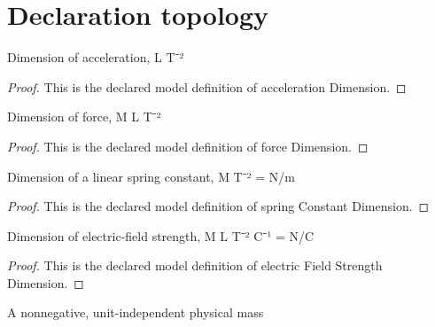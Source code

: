 \section{Declaration topology}
\begin{definition}
  \label{def:physics:phyx-mini-0891:phyxminiproblems-problemphyxmini0891-accelerationdimension}
  Dimension of acceleration, L T⁻²
\end{definition}
\begin{proof}
  This is the declared model definition of acceleration Dimension.
\end{proof}
\begin{definition}
  \label{def:physics:phyx-mini-0891:phyxminiproblems-problemphyxmini0891-forcedimension}
  Dimension of force, M L T⁻²
\end{definition}
\begin{proof}
  This is the declared model definition of force Dimension.
\end{proof}
\begin{definition}
  \label{def:physics:phyx-mini-0891:phyxminiproblems-problemphyxmini0891-springconstantdimension}
  Dimension of a linear spring constant, M T⁻² = N/m
\end{definition}
\begin{proof}
  This is the declared model definition of spring Constant Dimension.
\end{proof}
\begin{definition}
  \label{def:physics:phyx-mini-0891:phyxminiproblems-problemphyxmini0891-electricfieldstrengthdimension}
  Dimension of electric-field strength, M L T⁻² C⁻¹ = N/C
\end{definition}
\begin{proof}
  This is the declared model definition of electric Field Strength Dimension.
\end{proof}
\begin{definition}
  \label{def:physics:phyx-mini-0891:phyxminiproblems-problemphyxmini0891-massquantity}
  A nonnegative, unit-independent physical mass
\end{definition}
